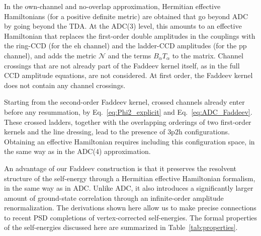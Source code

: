 \documentclass[aip,jcp,reprint,noshowkeys,superscriptaddress]{revtex4-1}
\newcommand{\ppphh}{\text{3p2h}}
\newcommand{\eh}{\text{eh}}
\newcommand{\pp}{\text{pp}}
\begin{document}
In the own-channel and no-overlap approximation, Hermitian effective Hamiltonians
(for a positive definite metric) are obtained that go beyond ADC by going beyond the TDA. 
At the ADC(3) level, this amounts to an effective Hamiltonian that
replaces the first-order double amplitudes in the couplings with the 
ring-CCD (for the $\eh$ channel) and the ladder-CCD amplitudes
(for the $\pp$ channel), and adds the metric $\mathcal N$ and the terms $B_\alpha T_\alpha$ to the matrix. Channel crossings
that are not already part of the Faddeev kernel itself,
as in the full CCD amplitude equations, are not considered. 
At first order, the Faddeev kernel does not contain any 
channel crossings.

Starting from the second-order Faddeev kernel, crossed channels 
already enter before any resummation, by Eq.~\eqref{eq:Phi2_explicit}
and Eq.~\eqref{eq:ADC_Faddeev}. These crossed ladders, together with the overlapping orderings of two first-order kernels and the line dressing, lead to
the presence of $\ppphh$ configurations. Obtaining 
an effective Hamiltonian requires including this configuration space,
in the same way as in the ADC(4) approximation.

An advantage of our Faddeev construction is that 
it preserves the resolvent structure of the 
self-energy through a Hermitian effective Hamiltonian 
formalism, in the same way as in ADC. Unlike ADC, it also 
introduces a significantly larger amount of 
ground-state correlation through an 
infinite-order amplitude renormalization. 
The derivations shown here allow us to make precise
connections to recent PSD completions of 
vertex-corrected self-energies.\cite{Pavlyukh2026,Bruneval2025,Marie2026}
The formal properties of the self-energies discussed here are
summarized in Table~\ref{tab:properties}.
\end{document}
